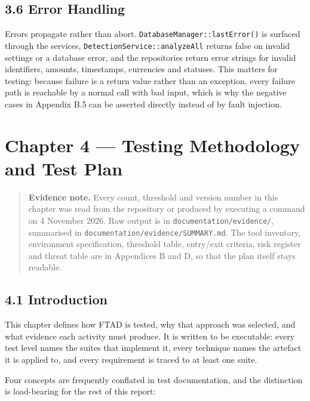 \documentclass[
  12pt,
]{report}
\begin{document}
\section{3.6 Error Handling}\label{error-handling}

Errors propagate rather than abort.
\texttt{DatabaseManager::lastError()} is surfaced through the services,
\texttt{Detection\-Service::analyzeAll} returns false on invalid settings
or a database error, and the repositories return error strings for
invalid identifiers, amounts, timestamps, currencies and statuses. This
matters for testing: because failure is a return value rather than an
exception, every failure path is reachable by a normal call with bad
input, which is why the negative cases in Appendix B.5 can be asserted
directly instead of by fault injection.

\chapter{Chapter 4 --- Testing Methodology and Test
Plan}\label{chapter-4-testing-methodology-and-test-plan}

\begin{quote}
\textbf{Evidence note.} Every count, threshold and version number in
this chapter was read from the repository or produced by executing a
command on 4 November 2026. Raw output is in
\texttt{documentation/\allowbreak{}evidence/\allowbreak{}}, summarised in
\texttt{documentation/\allowbreak{}evidence/\allowbreak{}SUMMARY.md}. The tool inventory,
environment specification, threshold table, entry/exit criteria, risk
register and threat table are in Appendices B and D, so that the plan
itself stays readable.
\end{quote}

\section{4.1 Introduction}\label{introduction-2}

This chapter defines how FTAD is tested, why that approach was selected,
and what evidence each activity must produce. It is written to be
executable: every test level names the suites that implement it, every
technique names the artefact it is applied to, and every requirement is
traced to at least one suite.

Four concepts are frequently conflated in test documentation, and the
distinction is load-bearing for the rest of this report:
\end{document}
